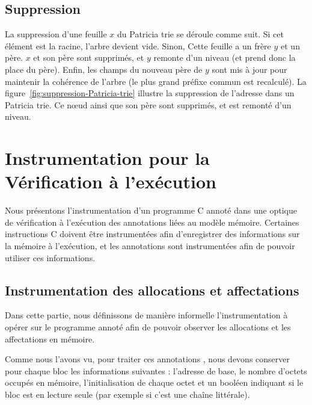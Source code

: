 \subsection{Suppression}





La suppression d'une feuille $x$ du Patricia trie se déroule comme suit.
Si cet élément est la racine, l'arbre devient vide.
Sinon, Cette feuille a un frère $y$ et un père.
$x$ et son père sont supprimés, et $y$ remonte d'un niveau (et prend donc la
place du père).
Enfin, les champs du nouveau père de $y$ sont mis à jour pour maintenir la
cohérence de l'arbre (le plus grand préfixe commun est recalculé).
La figure~\ref{fig:suppression-Patricia-trie} illustre la suppression de
l'adresse  dans un Patricia trie.
Ce n\oe{}ud ainsi que son père  sont supprimés, et
 est remonté d'un niveau.


\section{Instrumentation pour la Vérification à l'exécution}
\label{sec:mem-instru}


Nous présentons l'instrumentation d'un programme C annoté dans une optique de
vérification à l'exécution des annotations liées au modèle mémoire.
Certaines instructions C doivent être instrumentées afin d'enregistrer
des informations sur la mémoire à l'exécution, et les annotations sont
instrumentées afin de pouvoir utiliser ces informations.


\subsection{Instrumentation des allocations et affectations}


Dans cette partie, nous définissons de manière informelle l'instrumentation à
opérer sur le programme annoté afin de pouvoir observer les allocations et
les affectations en mémoire.

Comme nous l'avons vu, pour traiter ces annotations \eacsl, nous devons
conserver pour chaque bloc les informations suivantes : l'adresse de base, le
nombre d'octets occupés en mémoire, l'initialisation de chaque octet et un
booléen indiquant si le bloc est en lecture seule (par exemple si c'est une
chaîne littérale).

